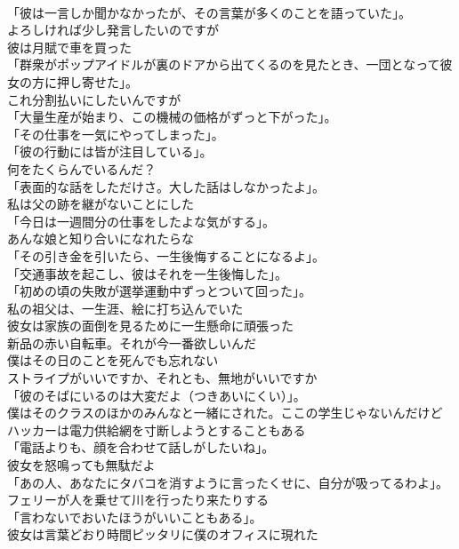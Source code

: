 \documentclass[8pt]{extreport}
\begin{document}
\begin{CJK}{UTF8}{min}
\\	「彼は一言しか聞かなかったが、その言葉が多くのことを語っていた」。	
\\	よろしければ少し発言したいのですが	
\\	彼は月賦で車を買った	
\\	「群衆がポップアイドルが裏のドアから出てくるのを見たとき、一団となって彼女の方に押し寄せた」。	
\\	これ分割払いにしたいんですが	
\\	「大量生産が始まり、この機械の価格がずっと下がった」。	
\\	「その仕事を一気にやってしまった」。	
\\	「彼の行動には皆が注目している」。	
\\	何をたくらんでいるんだ？	
\\	「表面的な話をしただけさ。大した話はしなかったよ」。	
\\	私は父の跡を継がないことにした	
\\	「今日は一週間分の仕事をしたよな気がする」。	
\\	あんな娘と知り合いになれたらな	
\\	「その引き金を引いたら、一生後悔することになるよ」。	
\\	「交通事故を起こし、彼はそれを一生後悔した」。	
\\	「初めの頃の失敗が選挙運動中ずっとついて回った」。	
\\	私の祖父は、一生涯、絵に打ち込んでいた	
\\	彼女は家族の面倒を見るために一生懸命に頑張った	
\\	新品の赤い自転車。それが今一番欲しいんだ	
\\	僕はその日のことを死んでも忘れない	
\\	ストライプがいいですか、それとも、無地がいいですか	
\\	「彼のそばにいるのは大変だよ（つきあいにくい）」。	
\\	僕はそのクラスのほかのみんなと一緒にされた。ここの学生じゃないんだけど	
\\	ハッカーは電力供給網を寸断しようとすることもある	
\\	「電話よりも、顔を合わせて話しがしたいね」。	
\\	彼女を怒鳴っても無駄だよ	
\\	「あの人、あなたにタバコを消すように言ったくせに、自分が吸ってるわよ」。	
\\	フェリーが人を乗せて川を行ったり来たりする	
\\	「言わないでおいたほうがいいこともある」。	
\\	彼女は言葉どおり時間ピッタリに僕のオフィスに現れた	

\end{CJK}
\end{document}
